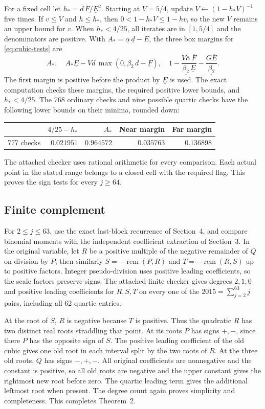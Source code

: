 For a fixed cell let \(h_*=\overline d\,\overline F/\underline E^2\).
Starting at \(V=5/4\), update \(V\gets(1-h_*V)^{-1}\) five times.
If \(v\le V\) and \(h\le h_*\), then \(0<1-h_*V\le1-hv\), so the
new \(V\) remains an upper bound for \(v\). When \(h_*<4/25\),
all iterates are in \([1,5/4]\) and the denominators are positive.
With \(A_*=\underline\alpha\,\underline d-\overline E\), the three
box margins for \eqref{eq:cubic-tests} are
\[
 A_*,\quad
 A_*\underline E-
 V\overline d\,\max(0,\overline{\beta_2}\,\overline d-\underline F),
 \quad
 1-\frac{V\overline\alpha\,\overline F}{\underline{\beta_2}\,\underline E}
   -\frac{G\overline E}{\underline{\beta_2}}.
\]
The first margin is positive before the product by \(\underline E\)
is used. The exact computation checks these margins, the required
positive lower bounds, and \(h_*<4/25\). The 768 ordinary checks and
nine possible quartic checks have the following lower bounds on
their minima, rounded down:
\begin{center}
\begin{tabular}{c|rrrr}
 & \(4/25-h_*\) & \(A_*\) & Near margin & Far margin\\
\hline
777 checks & \(0.021951\) & \(0.964572\) & \(0.035763\) & \(0.136898\)
\end{tabular}
\end{center}
The attached checker uses rational arithmetic for every comparison.
Each actual point in the stated range belongs to a closed cell with
the required flag. This proves the sign tests for every \(j\ge64\).

\subsection{Finite complement}

For \(2\le j\le63\), use the exact last-block recurrence of Section~4,
and compare binomial moments with the independent coefficient
extraction of Section~3. In the original variable, let \(R\) be a positive
multiple of the negative remainder of \(Q\) on division by \(P\),
then similarly \(S=-\operatorname{rem}(P,R)\) and
\(T=-\operatorname{rem}(R,S)\) up to positive factors.
Integer pseudo-division uses positive leading coefficients, so the
scale factors preserve signs. The attached finite checker gives
degrees \(2,1,0\) and positive leading coefficients for \(R,S,T\)
on every one of the \(2015=\sum_{j=2}^{63}j\) pairs, including
all 62 quartic entries.

At the root of \(S\), \(R\) is negative because \(T\) is positive.
Thus the quadratic \(R\) has two distinct real roots straddling that
point. At its roots \(P\) has signs \(+,-\), since there \(P\) has the
opposite sign of \(S\). The positive leading coefficient of the old
cubic gives one old root in each interval split by the two roots of
\(R\). At the three old roots, \(Q\) has signs \(-,+,-\).
All original coefficients are nonnegative and the constant is positive,
so all old roots are negative and the upper constant gives the
rightmost new root before zero. The quartic leading term gives
the additional leftmost root when present. The degree count again
proves simplicity and completeness. This completes Theorem~2.
